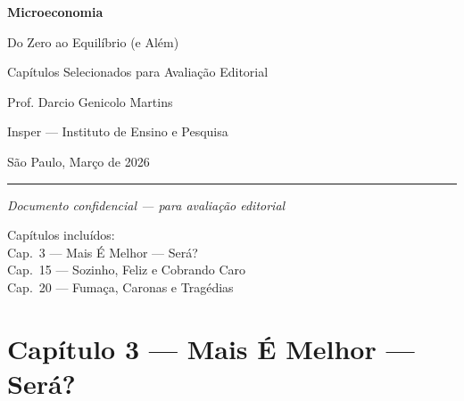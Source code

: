 \documentclass[11pt,twoside,openright]{book}
\begin{document}
\begin{titlepage}
\begin{center}
\vspace*{3cm}

{\fontsize{32}{38}\selectfont\sffamily\bfseries\textcolor{insper}{Microeconomia}}

\vspace{0.4cm}

{\fontsize{16}{20}\selectfont\sffamily Do Zero ao Equilíbrio (e Além)}

\vspace{2cm}

{\Large\sffamily Capítulos Selecionados para Avaliação Editorial}

\vspace{1.5cm}

{\large\sffamily Prof. Darcio Genicolo Martins}

{\normalsize\sffamily Insper — Instituto de Ensino e Pesquisa}

\vspace{0.5cm}

{\normalsize\sffamily São Paulo, Março de 2026}

\vspace{3cm}

\rule{0.4\textwidth}{0.5pt}

\vspace{0.3cm}

{\small\itshape Documento confidencial — para avaliação editorial}

\vspace{1cm}

{\small\sffamily Capítulos incluídos:}\\[6pt]
{\small Cap.\ 3 — Mais É Melhor — Será?}\\
{\small Cap.\ 15 — Sozinho, Feliz e Cobrando Caro}\\
{\small Cap.\ 20 — Fumaça, Caronas e Tragédias}

\end{center}
\end{titlepage}

\tableofcontents
\newpage

\chapter{Capítulo 3 --- Mais É Melhor ---
Será?}\label{capuxedtulo-3-mais-uxe9-melhor-seruxe1}
\end{document}
